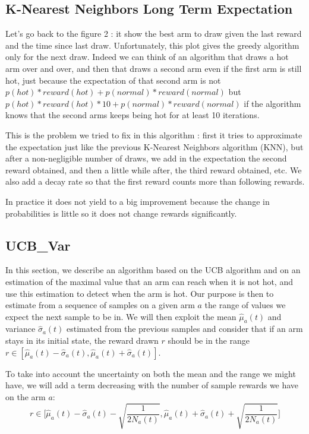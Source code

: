 \documentclass{article} %
\begin{document}
\subsection{K-Nearest Neighbors Long Term Expectation}

Let's go back to the figure 2 : it show the best arm to draw given the last reward and the time since last draw. Unfortunately, this plot gives the greedy algorithm only for the next draw. Indeed we can think of an algorithm that draws a hot arm over and over, and then that draws a second arm even if the first arm is still hot, just because the expectation of that second arm is not $p(hot)*reward(hot) + p(normal)*reward(normal)$ but $p(ho	t)*reward(hot)*10 + p(normal)*reward(normal)$ if the algorithm knows that the second arms keeps being hot for at least 10 iterations.

This is the problem we tried to fix in this algorithm : first it tries to approximate the expectation just like the previous K-Nearest Neighbors algorithm (KNN), but after a non-negligible number of draws, we add in the expectation the second reward obtained, and then a little while after, the third reward obtained, etc. We also add a decay rate so that the first reward counts more than following rewards.

In practice it does not yield to a big improvement because the change in probabilities is little so it does not change rewards significantly.

\subsection{UCB\_Var}

In this section, we describe an algorithm based on the UCB algorithm and on an estimation of the maximal
value that an arm can reach when it is not hot, and use this estimation to detect when the
arm is hot. Our purpose is then to estimate from a sequence of samples on a given arm $a$ the range
of values we expect the next sample to be in. We will then exploit the mean $\hat\mu_a(t)$ and variance $\hat\sigma_a(t)$
estimated from the previous samples and consider that if an arm stays in its initial
state, the reward drawn $r$ should be in the range $r \in [\hat\mu_a(t)-\hat\sigma_a(t), \hat\mu_a(t)+\hat\sigma_a(t)]$.

To take into account the uncertainty on both the mean and the range we might have,
we will add a term decreasing with the number of sample rewards we have on the arm $a$:
\begin{equation}\label{UCB-var-bound}
	r \in \Big[\hat\mu_a(t)-\hat\sigma_a(t)-\sqrt{\frac{1}{2N_a(t)}}, \hat\mu_a(t)+\hat\sigma_a(t)+\sqrt{\frac{1}{2N_a(t)}}\Big]
\end{equation}
\end{document}
